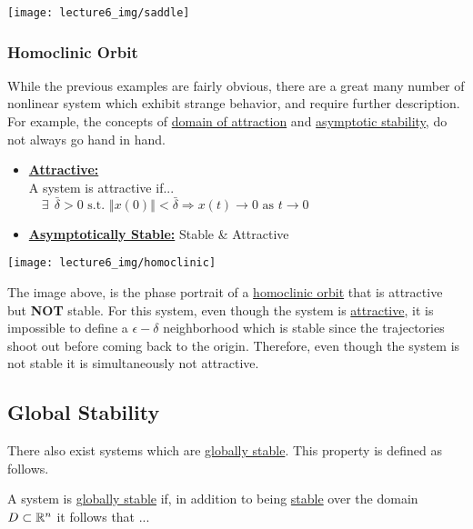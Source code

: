 \begin{center}
  \texttt{[image: lecture6\_img/saddle]}
\end{center}

\subsubsection*{Homoclinic Orbit}
While the previous examples are fairly obvious, there are a great many number of nonlinear system which exhibit strange behavior, and require further description. \\

\noindent For example, the concepts of \underline{domain of attraction} and \underline{asymptotic stability}, do not always go hand in hand.

\begin{itemize}
  \item \textbf{\underline{Attractive:}}  \\ A system is attractive if... \\ $\quad \exists \:\: \bar{\delta} >0 \text{ s.t. } \left \Vert x(0) \right\Vert <\bar{\delta} \Rightarrow x(t) \rightarrow 0 \text{ as } t \rightarrow 0$

  \item \textbf{\underline{Asymptotically Stable:}} Stable \& Attractive \\
\end{itemize}


\begin{center}
  \texttt{[image: lecture6\_img/homoclinic]}
\end{center}

\noindent The image above, is the phase portrait of a  \underline{homoclinic orbit} that is attractive but \textbf{NOT} stable. For this system, even though the system is \underline{attractive}, it is impossible to define a $\epsilon-\delta$ neighborhood which is stable since the trajectories shoot out before coming back to the origin. Therefore, even though the system is not stable it is simultaneously  not attractive.

\subsection*{Global Stability}
There also exist systems which are \underline{globally stable}. This property is defined as follows.

\noindent A system is \underline{globally stable} if, in addition to being \underline{stable} over the domain $D \subset \mathbb{R}^n$ it follows that ...

